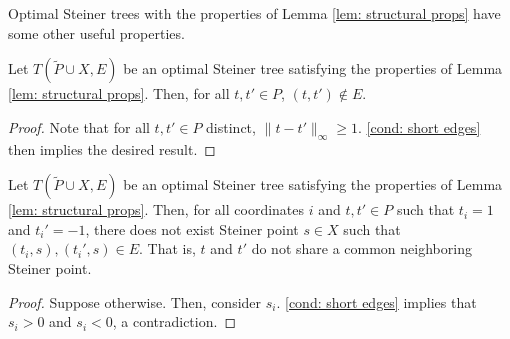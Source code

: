 \documentclass{article}\providecommand{\DeclareRedundantLanguages}[2]{}\usepackage[a4paper,margin=20mm]{geometry}
\newcommand{\1}{\textbf{1}}
\renewcommand{\tilde}{\widetilde}
\begin{document}
Optimal Steiner trees with the properties of Lemma \ref{lem: structural props} have some other useful properties.

\begin{corollary} \label{cor: no term term edges}
Let $T(\tilde{P} \cup X, E)$ be an optimal Steiner tree satisfying the properties of Lemma \ref{lem: structural props}. Then, for all $t,t' \in P$, $(t,t') \not\in E$.
\end{corollary}
\begin{proof}
Note that for all $t, t' \in P$ distinct, $\|t - t'\|_{\infty} \geq 1$. \ref{cond: short edges} then implies the desired result.
\end{proof}

\begin{corollary} \label{cor: independence struct}
Let $T(\tilde{P} \cup X, E)$ be an optimal Steiner tree satisfying the properties of Lemma \ref{lem: structural props}. Then, for all coordinates $i$ and  $t,t' \in P$ such that $t_i = 1$ and $t_i' = -1$, there does not exist Steiner point $s \in X$ such that $(t_i,s), (t_i', s) \in E$. That is, $t$ and $t'$ do not share a common neighboring Steiner point.
\end{corollary}
\begin{proof}
Suppose otherwise. Then, consider $s_i$. \ref{cond: short edges} implies that $s_i > 0$ and $s_i < 0$, a contradiction.
\end{proof}
\end{document}
